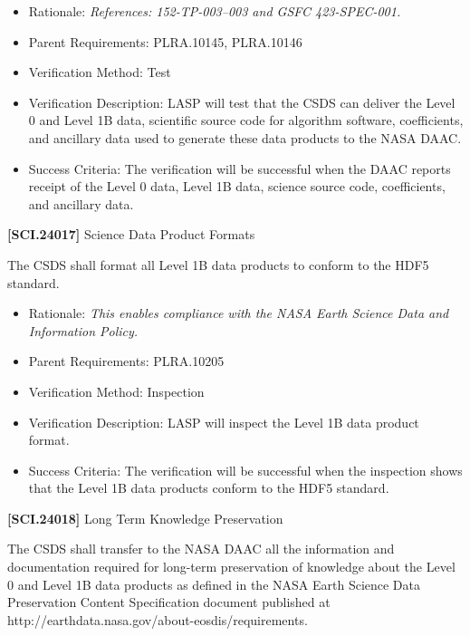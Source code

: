 \begin{itemize}
\item{} Rationale: \emph{References: 152-TP-003--003 and GSFC 423-SPEC-001.}

\item{} Parent Requirements: PLRA.10145, PLRA.10146

\item{} Verification Method: Test

\item{} Verification Description: \gls{LASP} will \gls{test} that the \gls{CSDS} can deliver the Level 0 and Level 1B data, scientific source code for algorithm software, coefficients, and ancillary data used to generate these data products to the NASA \gls{DAAC}.

\item{} Success Criteria: The verification will be successful when the \gls{DAAC} reports receipt of the Level 0 data, Level 1B data, science source code, coefficients, and ancillary data.

\end{itemize}

\textbf{[SCI.24017]} Science Data Product Formats

The \gls{CSDS} shall format all Level 1B data products to conform to the HDF5 standard.

\begin{itemize}
\item{} Rationale: \emph{This enables compliance with the NASA Earth Science Data and Information Policy.}

\item{} Parent Requirements: PLRA.10205

\item{} Verification Method: Inspection

\item{} Verification Description: \gls{LASP} will inspect the Level 1B data product format.

\item{} Success Criteria: The verification will be successful when the \gls{inspection} shows that the Level 1B data products conform to the HDF5 standard.

\end{itemize}

\textbf{[SCI.24018]} Long Term Knowledge Preservation

The \gls{CSDS} shall transfer to the NASA \gls{DAAC} all the information and documentation required for long-term preservation of knowledge about the Level 0 and Level 1B data products as defined in the NASA Earth Science Data Preservation Content Specification document published at http:\slash \slash earthdata.nasa.gov\slash about-eosdis\slash requirements.

